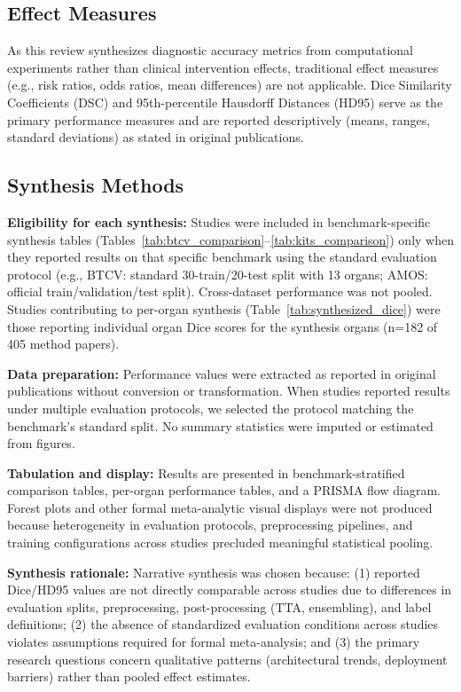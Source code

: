 \subsection{Effect Measures}

As this review synthesizes diagnostic accuracy metrics from computational experiments rather than clinical intervention effects, traditional effect measures (e.g., risk ratios, odds ratios, mean differences) are not applicable. Dice Similarity Coefficients (DSC) and 95th-percentile Hausdorff Distances (HD95) serve as the primary performance measures and are reported descriptively (means, ranges, standard deviations) as stated in original publications.

\subsection{Synthesis Methods}

\textbf{Eligibility for each synthesis:} Studies were included in benchmark-specific synthesis tables (Tables~\ref{tab:btcv_comparison}--\ref{tab:kits_comparison}) only when they reported results on that specific benchmark using the standard evaluation protocol (e.g., BTCV: standard 30-train/20-test split with 13 organs; AMOS: official train/validation/test split). Cross-dataset performance was not pooled. Studies contributing to per-organ synthesis (Table~\ref{tab:synthesized_dice}) were those reporting individual organ Dice scores for the synthesis organs (n=182 of 405 method papers).

\textbf{Data preparation:} Performance values were extracted as reported in original publications without conversion or transformation. When studies reported results under multiple evaluation protocols, we selected the protocol matching the benchmark's standard split. No summary statistics were imputed or estimated from figures.

\textbf{Tabulation and display:} Results are presented in benchmark-stratified comparison tables, per-organ performance tables, and a PRISMA flow diagram. Forest plots and other formal meta-analytic visual displays were not produced because heterogeneity in evaluation protocols, preprocessing pipelines, and training configurations across studies precluded meaningful statistical pooling.

\textbf{Synthesis rationale:} Narrative synthesis was chosen because: (1) reported Dice/HD95 values are not directly comparable across studies due to differences in evaluation splits, preprocessing, post-processing (TTA, ensembling), and label definitions; (2) the absence of standardized evaluation conditions across studies violates assumptions required for formal meta-analysis; and (3) the primary research questions concern qualitative patterns (architectural trends, deployment barriers) rather than pooled effect estimates.

